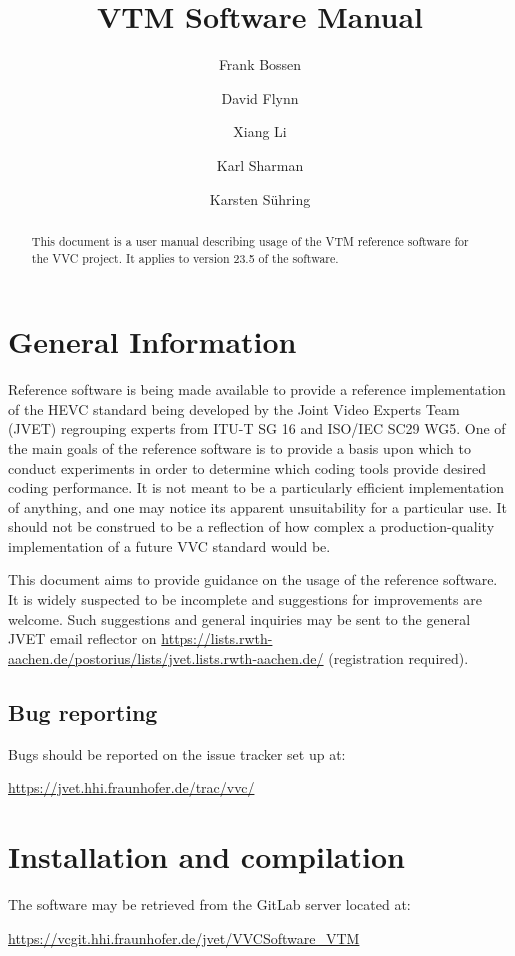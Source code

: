 \documentclass[a4paper,11pt]{jvetdoc}
\title{VTM Software Manual}
\author{%
	Frank Bossen
	\email{frank@bossentech.com}
	\and
	David Flynn
	\and
	Xiang Li
	\email{xlxiangli@google.com}
	\and
	Karl Sharman
	\email{karl.sharman@eu.sony.com}
	\and
	Karsten S\"uhring
	\email{karsten.suehring@hhi.fraunhofer.de}
}
\begin{document}
\maketitle
\begin{abstract}
This document is a user manual describing usage of the VTM reference software
for the VVC project. It applies to version 23.5 of the software.
\end{abstract}

\tableofcontents
\listoftables


\section{General Information}
Reference software is being made available to provide a reference
implementation of the HEVC standard being developed by the Joint 
Video Experts Team (JVET) regrouping experts from
ITU-T SG 16 and ISO/IEC SC29 WG5. One of the main goals of the
reference software is to provide a basis upon which to conduct
experiments in order to determine which coding tools provide desired
coding performance. It is not meant to be a particularly efficient
implementation of anything, and one may notice its apparent
unsuitability for a particular use. It should not be construed to be a
reflection of how complex a production-quality implementation of a
future VVC standard would be.

This document aims to provide guidance on the usage of the reference
software. It is widely suspected to be incomplete and suggestions for
improvements are welcome. Such suggestions and general inquiries may be
sent to the general JVET email reflector on
\url{https://lists.rwth-aachen.de/postorius/lists/jvet.lists.rwth-aachen.de/} 
(registration required).

\subsection*{Bug reporting}
Bugs should be reported on the issue tracker set up at:

\url{https://jvet.hhi.fraunhofer.de/trac/vvc/}

\section{Installation and compilation}
The software may be retrieved from the GitLab server located at:

\url{https://vcgit.hhi.fraunhofer.de/jvet/VVCSoftware_VTM}
\end{document}
